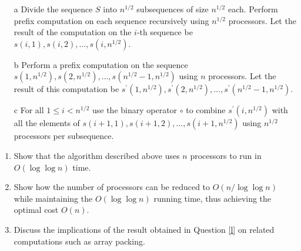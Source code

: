 \documentclass[11pt]{article}
\begin{document}
    \begin{enumerate}[leftmargin=*]
      \item[a] Divide the sequence $S$ into $n^{1/2}$ subsequences of size $n^{1/2}$ each. Perform prefix computation on each sequence recursively using $n^{1/2}$ processors. Let the result of the computation on the $i$-th sequence be $s(i,1), s(i,2), \dots, s(i,n^{1/2})$.
      \item[b] Perform a prefix computation on the sequence $s(1,n^{1/2}), s(2,n^{1/2}), \dots, s(n^{1/2}-1,n^{1/2})$ using $n$ processors. Let the result of this computation be $s^\prime(1,n^{1/2}), s^\prime(2,n^{1/2}), \dots, s^\prime(n^{1/2}-1,n^{1/2})$.
      \item[c] For all $1 \leq i < n^{1/2}$ use the binary operator $\circ$ to combine $s^\prime(i,n^{1/2})$ with all the elements of $s(i+1,1),s(i+1,2),\dots,s(i+1,n^{1/2})$ using $n^{1/2}$ processors per subsequence.
    \end{enumerate}

    \begin{enumerate}[leftmargin=*]
      \item Show that the algorithm described above uses $n$ processors to run in $O(\log \log n)$ time.
      \item \label{l} Show how the number of processors can be reduced to $O(n/\log \log n)$ while maintaining the $O(\log \log n)$ running time, thus achieving the optimal cost $O(n)$.
      \item Discuss the implications of the result obtained in Question \ref{l} on related computations such as array packing.
    \end{enumerate}
\end{document}
